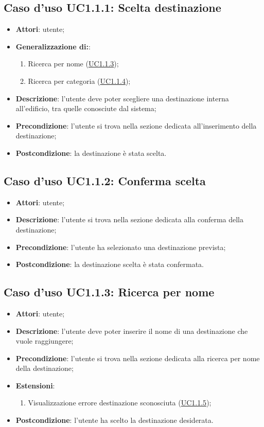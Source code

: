 \documentclass[../AnalisiDeiRequisiti.tex]{subfiles}
\begin{document}
\subsection{Caso d'uso UC1.1.1: Scelta destinazione}
\begin{itemize}
\item \textbf{Attori}: utente;

        \item \textbf{Generalizzazione di:}:
          \begin{enumerate}
          \item Ricerca per nome (\hyperlink{UC1.1.3}{UC1.1.3});
          \item Ricerca per categoria (\hyperlink{UC1.1.4}{UC1.1.4});

      \end{enumerate}
\item \textbf{Descrizione}: l'utente deve poter scegliere una destinazione interna all'edificio, tra quelle conosciute dal sistema; 
      \item \textbf{Precondizione}: l'utente si trova nella sezione dedicata all'inserimento della destinazione;
    \item \textbf{Postcondizione}: la destinazione è stata scelta.
  \end{itemize}
\hypertarget{UC1.1.2}{}
\subsection{Caso d'uso UC1.1.2: Conferma scelta}
\begin{itemize}
\item \textbf{Attori}: utente;
\item \textbf{Descrizione}: l'utente si trova nella sezione dedicata alla conferma della destinazione; 
      \item \textbf{Precondizione}: l'utente ha selezionato una destinazione prevista;
    \item \textbf{Postcondizione}: la destinazione scelta è stata confermata.
  \end{itemize}
\hypertarget{UC1.1.3}{}
\subsection{Caso d'uso UC1.1.3: Ricerca per nome}
\begin{itemize}
\item \textbf{Attori}: utente;
\item \textbf{Descrizione}: l'utente deve poter inserire il nome di una destinazione che vuole raggiungere; 
      \item \textbf{Precondizione}: l'utente si trova nella sezione dedicata alla ricerca per nome della destinazione;
    \item \textbf{Estensioni}:
      \begin{enumerate}
          \item Visualizzazione errore destinazione sconosciuta (\hyperlink{UC1.1.5}{UC1.1.5});

      \end{enumerate}
    \item \textbf{Postcondizione}: l'utente ha scelto la destinazione desiderata.
  \end{itemize}
\hypertarget{UC1.1.4}{}
\end{document}
